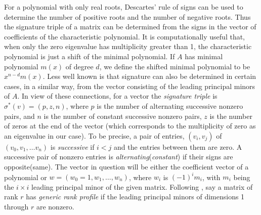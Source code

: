 \documentclass{acm_proc_article-sp}
\newcommand{\signature}{\ensuremath{\sigma^{*}}}
\newcommand{\p}{\ensuremath{p}}
\newcommand{\z}{\ensuremath{z}}
\newcommand{\n}{\ensuremath{n}}
\begin{document}
For a polynomial with only real roots, Descartes' rule of signs can be used to 
determine the number of positive roots and the number of negative roots.
Thus the signature triple of a matrix can be determined from the signs in 
the vector of coefficients of the characteristic polynomial.  
It is computationally useful that,
when only the zero eigenvalue has multiplicity greater
than 1, the characteristic polynomial is just a shift of the minimal 
polynomial.  If $A$ has minimal polynomial $m(x)$ of degree $d$, we define
the shifted minimal polynomial to be $x^{n-d} m(x)$.  
Less well known
is that signature can also be determined in certain cases, in a similar way, 
from the vector consisting of the leading principal minors of $A$. 
In view of these connections, for a vector the {\em signature triple} 
is 
$\signature(v) = (\p, \z, \n)$, where
$\p$ is the number of alternating successive nonzero pairs, and 
$\n$ is the number of constant successive nonzero pairs,
$\z$ is the number of zeros at the end of the vector
(which corresponds to the multiplicity of zero as an eigenvalue in our case).
To be precise, 
a pair of entries, $(v_i, v_j)$ of $(v_0, v_1, \ldots v_n)$ is {\em successive} 
if $i < j$ and the entries between them are zero.
A successive pair of nonzero entries is {\em alternating}({\em constant}) if 
their signs are opposite(same).
The vector in question will be either the coefficient vector of a polynomial or 
$w = (w_0 = 1, w_1, \ldots, w_n)$, where $w_i$ is $(-1)^i m_i$, with $m_i$ being
the $i\times i$ leading principal minor of the given matrix. 
Following \cite{KaLo96:issac},
say a matrix of rank $r$ has 
{\em generic rank profile} if the leading principal minors 
of dimensions 1 through $r$ are nonzero. 
\end{document}
